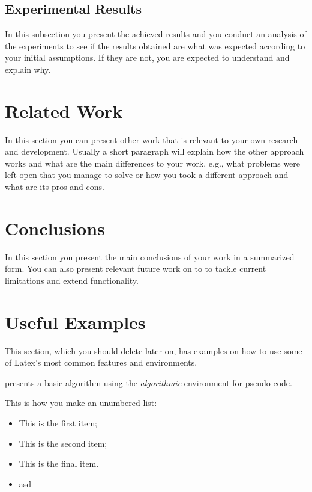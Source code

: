 \documentclass[sigconf,balance,nonacm,authordraft]{acmart}
\begin{document}
\subsection{Experimental Results}
In this subsection you present the achieved results and you conduct an analysis of the experiments to see if the results obtained are what was expected according to your initial assumptions. If they are not, you are expected to understand and explain why.

\section{Related Work}
\label{sec:rel}
In this section you can present other work that is relevant to your own research and development. Usually a short paragraph will explain how the other approach works and what are the main differences to your work, e.g., what problems were left open that you manage to solve or how you took a different approach and what are its pros and cons.

\section{Conclusions}
\label{sec:conclusions}
In this section you present the main conclusions of your work in a summarized form. You can also present relevant future work on to to tackle current limitations and extend functionality.

\section{Useful Examples}
\label{sec:examples}
This section, which you should delete later on, has examples on how to use some of Latex's most common features and environments.



 presents a basic algorithm using the \textit{algorithmic} environment for pseudo-code.

This is how you make an unumbered list:
\begin{itemize}
    \item This is the first item;
    \item This is the second item;
    \item This is the final item.
    \item asd
\end{itemize}
\end{document}
